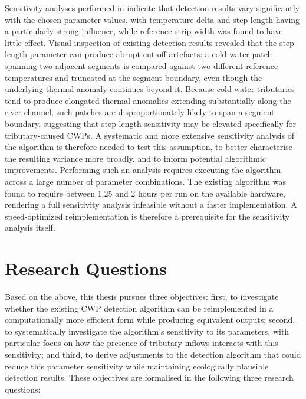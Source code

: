 Sensitivity analyses performed in 
\citet{tonolla_thermische-kartographie_2026} indicate that detection results 
vary significantly with the chosen parameter values, with temperature delta and 
step length having a particularly strong influence, while reference strip width 
was found to have little effect. Visual inspection of existing detection results 
revealed that the step length parameter can produce abrupt cut-off artefacts: 
a cold-water patch spanning two adjacent segments is compared against two 
different reference temperatures and truncated at the segment boundary, even 
though the underlying thermal anomaly continues beyond it. Because cold-water 
tributaries tend to produce elongated thermal anomalies extending substantially 
along the river channel, such patches are disproportionately likely to span a 
segment boundary, suggesting that step length sensitivity may be elevated 
specifically for tributary-caused CWPs. A systematic and more extensive 
sensitivity analysis of the algorithm is therefore needed to test this 
assumption, to better characterise the resulting variance more broadly, and to 
inform potential algorithmic improvements. Performing such an analysis requires 
executing the algorithm across a large number of parameter combinations. The 
existing algorithm was found to require between 1.25 and 2 hours per run on 
the available hardware, rendering a full sensitivity analysis infeasible without 
a faster implementation. A speed-optimized reimplementation is therefore a 
prerequisite for the sensitivity analysis itself.


\section*{Research Questions}

Based on the above, this thesis pursues three objectives: first, to investigate 
whether the existing CWP detection algorithm can be reimplemented in a 
computationally more efficient form while producing equivalent outputs; second, to 
systematically investigate the algorithm's sensitivity to its parameters, with 
particular focus on how the presence of tributary inflows interacts with this 
sensitivity; and third, to derive adjustments to the detection algorithm that could 
reduce this parameter sensitivity while maintaining ecologically plausible detection 
results. These objectives are formalised in the following three research questions:

